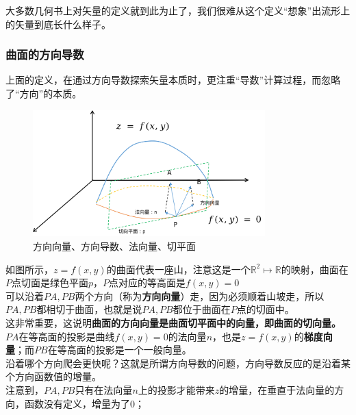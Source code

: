 \documentclass[hpyerref,UTF8,a4paper,titlepage,12pt,oneside]{ctexbook}
\theoremstyle{definition}
\begin{document}
大多数几何书上对矢量的定义就到此为止了，我们很难从这个定义“想象”出流形上的矢量到底长什么样子。

\subsubsection*{曲面的方向导数}

上面的定义，在通过方向导数探索矢量本质时，更注重“导数”计算过程，而忽略了“方向”的本质。\\

\begin{figure}[H]
	\begin{center}
		\includegraphics[width=0.8\textwidth]{images/direct_vector.png}
	\end{center}
	\caption{方向向量、方向导数、法向量、切平面}
\end{figure}	

如图所示，$z=f(x,y)$的曲面代表一座山，注意这是一个$\mathbb{R}^2 \mapsto \mathbb{R}$的映射，曲面在$P$点切面是绿色平面$p$，$P$点对应的等高面是$f(x,y) = 0$\\

可以沿着$PA,PB$两个方向（称为\textbf{方向向量}）走，因为必须顺着山坡走，所以$PA,PB$都相切于曲面，也就是说$PA,PB$都位于曲面在$P$点的切面中。\\

这非常重要，这说明\textbf{曲面的方向向量是曲面切平面中的向量，即曲面的切向量。}\\

$PA$在等高面的投影是曲线$f(x,y) = 0$的法向量$n$，也是$z=f(x,y)$的\textbf{梯度向量}；而$PB$在等高面的投影是一个一般向量。\\

沿着哪个方向爬会更快呢？这就是所谓方向导数的问题，方向导数反应的是沿着某个方向函数值的增量。\\

注意到，$PA,PB$只有在法向量$n$上的投影才能带来$z$的增量，在垂直于法向量的方向，函数没有定义，增量为了$0$；\\
\end{document}
